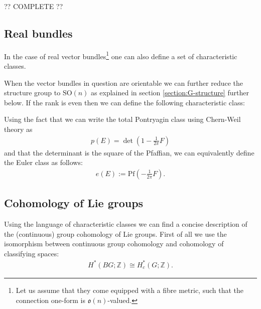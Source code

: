     ?? COMPLETE ??

\subsection{Real bundles}

    In the case of real vector bundles\footnote{Let us assume that they come equipped with a fibre metric, such that the connection one-form is $\mathfrak{o}(n)$-valued.} one can also define a set of characteristic classes.


    When the vector bundles in question are orientable we can further reduce the structure group to $\text{SO}(n)$ as explained in section \ref{section:G-structure} further below. If the rank is even then we can define the following characteristic class:
    \begin{property}
        Using the fact that we can write the total Pontryagin class using Chern-Weil theory as
        \begin{gather}
            p(E) = \det\left(1 - \frac{1}{2\pi}F\right)
        \end{gather}
        and that the determinant is the square of the Pfaffian, we can equivalently define the Euler class as follows:
        \begin{gather}
            e(E) := \text{Pf}\left(-\frac{1}{2\pi}F\right).
        \end{gather}
    \end{property}

\subsection{Cohomology of Lie groups}

    Using the language of characteristic classes we can find a concise description of the (continuous) group cohomology of Lie groups. First of all we use the isomorphism between continuous group cohomology and cohomology of classifying spaces:
    \begin{gather}
        H^*(BG; \mathbb{Z})\cong H^*_c(G; \mathbb{Z}).
    \end{gather}

